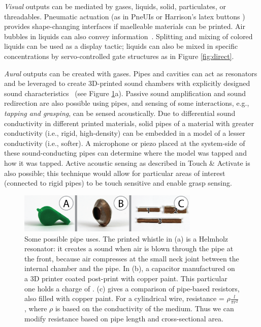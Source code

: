 \emph{Visual} outputs can be mediated by gases, liquids, solid, particulates, or threadables.  Pneumatic actuation (as in PneUIs \cite{Yao-pneui} or Harrison's latex buttons \cite{Harrison-buttons}) provides shape-changing interfaces if maelleable materials can be printed. 
Air bubbles in liquids can also convey information~\cite{Heiner1999Percolator}. Splitting and mixing of colored liquids can be used as a display tactic; liquids can also be mixed in specific concentrations by servo-controlled gate structures as in Figure \ref{fig:direct}. %

\emph{Aural} outputs can be created with gases.  Pipes and cavities can act as resonators and be leveraged to create 3D-printed sound chambers with explicitly designed sound characteristics~\cite{Zoran-flute} (see Figure \ref{fig:speculative}a).  %
Passive sound amplification and sound redirection are also possible using pipes, and sensing of some interactions, e.g., \emph{tapping and grasping}, can be sensed acoustically.  Due to differential sound conductivity in different printed materials, solid pipes of a material with greater conductivity (i.e., rigid, high-density) can be embedded in a model of a lesser conductivity (i.e., softer).  A microphone or piezo placed at the system-side of these sound-conducting pipes can determine where the model was tapped and how it was tapped.  Active acoustic sensing as described in Touch \& Activate \cite{Ono-touchandactivate} is also possible; this technique would allow for particular areas of interest (connected to rigid pipes) to be touch sensitive and enable grasp sensing.

\begin{figure}[h]
\centering
    \includegraphics[width=3.4in]{figures/speculative.png}
\caption{Some possible pipe uses.  The printed whistle in (a) is a Helmholz resonator: it creates a sound when air is blown through the pipe at the front, because air compresses at the small neck joint between the internal chamber and the pipe.  In (b), a capacitor manufactured on a 3D printer coated post-print with copper paint.  This particular one holds a charge of .  (c) gives a comparison of pipe-based resistors, also filled with copper paint.  For a cylindrical wire, resistance = $\rho\frac{l}{\pi r^2}$, where $\rho$ is based on the conductivity of the medium.  Thus we can modify resistance based on pipe length and cross-sectional area.}
\label{fig:speculative}
\end{figure}


